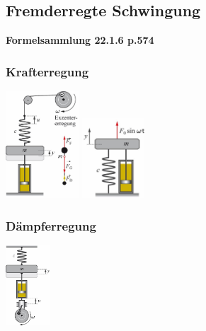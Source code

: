 \subsection{Fremderregte Schwingung}

\textbf{Formelsammlung 22.1.6 p.574}

\begin{center}
	\begin{minipage}{0.3\textwidth}
		\subsubsection{Krafterregung}
		\includegraphics[height=4cm,keepaspectratio=true]{Images/krafterregung_a.png}
		\includegraphics[height=3cm,keepaspectratio=true]{Images/krafterregung_b.png}
	\end{minipage}%
	\begin{minipage}{0.3\textwidth}
		\subsubsection{Dämpferregung}
		\includegraphics[height=3cm,keepaspectratio=true]{Images/daempferregung.png}
	\end{minipage}
\end{center}
